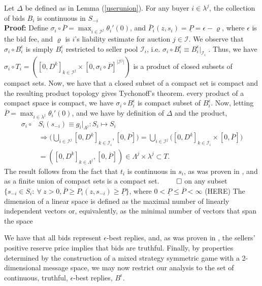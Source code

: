 \documentclass[sigconf, anonymous]{acmart}
\newcommand{\mcI}{\mathcal{I}}
\newcommand{\g}{\sigma}
\theoremstyle{definition}
\begin{document}
{
Let $\Delta$ be defined as in Lemma (\ref{userunion}). For any buyer
$i\in\lambda^j$, the collection of bids $B_i$ is continuous in $S_{-i}$
}\\
\textbf{Proof:}
Define $\g_i \circ \overline{P} = \max_{i\in\mcI^j} \theta_i'(0)$, and
$\bar{P}_i(z, s_{i}) = \underline{P} = \epsilon -\varrho$, where $\epsilon$ is
the bid fee, and $\varrho$ is $i$'s liability estimate for auction $j\in\mcI$. 
We observe that $\g_i \circ B_i^\epsilon$ is simply $B_i^\epsilon$ restricted to seller pool
$\mcI_i$, i.e. $\g_i \circ B_i^\epsilon \equiv B_i^\epsilon\vert_{\mcI_i}$ . Thus,
we have $\g_i \circ T_i = ([0,D^k]_{k\in\mcI^j}\times [0,\g_i \circ
\overline{P}]^{\vert \mcI^j\vert})$
is a product of closed subsets of compact sets. Now, we have that a closed
subset of a compact set is compact and the resulting product topology gives
Tychonoff's theorem. every product of a
compact space is compact, we have $\g_i \circ B_i^\epsilon$
is compact subset of $B_i^\epsilon$.
 Now, letting $\overline{P} = \max_{i\in\lambda^j} \theta_i'(0)$, and we have by
definition of $\Delta$ and the product, 
\begin{align*}
    \g_i \circ& S_i(s_{-i}) \equiv g_i\vert_{\Lambda^j} : S_i \mapsto S_i \\
    &\Rightarrow\bigg(\bigcup_{i\in\mcI^j} [0,D^k]_{k\in\mcI_i},
[0,\overline{P}]\bigg)
    = \bigcup_{i\in\mcI^j}\bigg([0,D^k]_{k\in\mcI_i} \times
[0,\overline{P}]\bigg) \\
    &=  ([0,D^k]_{k\in\Lambda^j}, [0,\overline{P}]) \in \Lambda^j
\times \lambda^j \subset T.
\end{align*}
The result follows from the fact that $t_i$ is continuous in $s_i$, as was
proven in \cite{semret}, and as a finite union of compact sets is a compact set.
$\qed$
on any subset $\lbrace
s_{-i}\in S_i : \ \forall \ z > 0, \overline{P} \ge P_i(z,s_{-i}) \ge
\underline{P} \rbrace$, where $0<\underline{P}\le \overline{P} < \infty$
(HERE) The dimension of a linear space is defined as the maximal number of linearly
independent vectors or, equivalently, as the minimal number of vectors that span
the space

We have that all bids represent $\epsilon$-best replies, and, as was proven in
\cite{lazar}, the sellers' positive reserve price implies that bids are
truthful. Finally, by properties determined by the construction of a mixed strategy
symmetric game with a 2-dimensional message space, we may now restrict our
analysis to the set of continuous, truthful, $\epsilon$-best replies, $B^\epsilon$.
\end{document}
